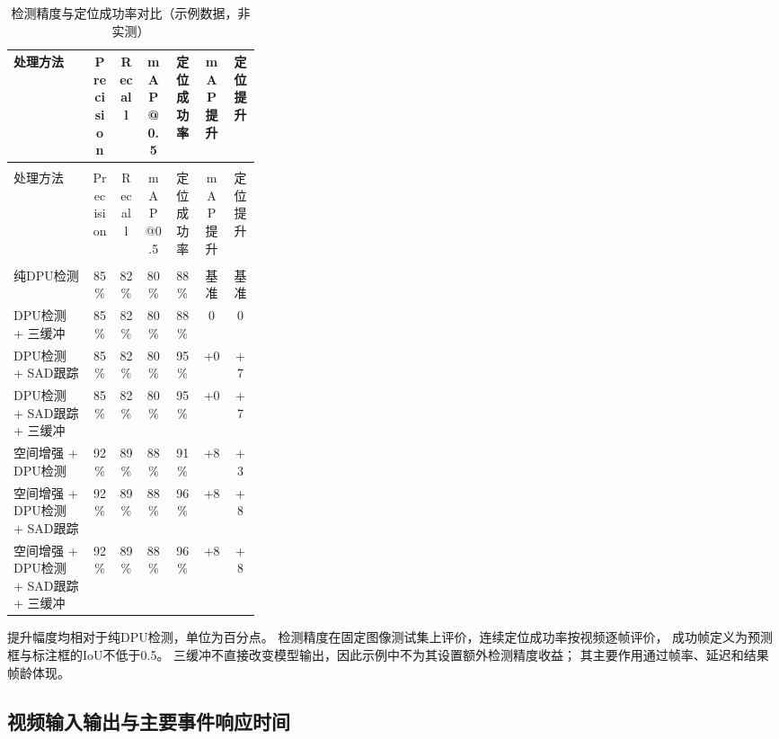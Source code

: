 \documentclass[UTF8,a4paper,12pt,fontset=windows]{ctexart}
\renewcommand{\thetable}{1-\arabic{table}}
\begin{document}
\begin{longtable}{
    >{\raggedright\arraybackslash}p{0.32\linewidth}
    cccccc
}
\caption{检测精度与定位成功率对比（示例数据，非实测）}
\label{tab:accuracy_improvement}\\

\toprule
处理方法
& Precision
& Recall
& mAP@0.5
& 定位成功率
& mAP提升
& 定位提升 \\
\midrule
\endfirsthead

\multicolumn{7}{c}{\small 表\thetable（续）}\\[4pt]
\toprule
处理方法
& Precision
& Recall
& mAP@0.5
& 定位成功率
& mAP提升
& 定位提升 \\
\midrule
\endhead

\midrule
\multicolumn{7}{r}{\footnotesize 接下页}\\
\endfoot

\bottomrule
\endlastfoot

纯DPU检测
& 85\% & 82\% & 80\% & 88\% & 基准 & 基准 \\

DPU检测 + 三缓冲
& 85\% & 82\% & 80\% & 88\% & 0 & 0 \\

DPU检测 + SAD跟踪
& 85\% & 82\% & 80\% & 95\% & +0 & +7 \\

DPU检测 + SAD跟踪 + 三缓冲
& 85\% & 82\% & 80\% & 95\% & +0 & +7 \\

空间增强 + DPU检测
& 92\% & 89\% & 88\% & 91\% & +8 & +3 \\

空间增强 + DPU检测 + SAD跟踪
& 92\% & 89\% & 88\% & 96\% & +8 & +8 \\

空间增强 + DPU检测 + SAD跟踪 + 三缓冲
& 92\% & 89\% & 88\% & 96\% & +8 & +8 \\

\end{longtable}
\endgroup

\noindent
提升幅度均相对于纯DPU检测，单位为百分点。
检测精度在固定图像测试集上评价，连续定位成功率按视频逐帧评价，
成功帧定义为预测框与标注框的IoU不低于0.5。
三缓冲不直接改变模型输出，因此示例中不为其设置额外检测精度收益；
其主要作用通过帧率、延迟和结果帧龄体现。


\subsection*{视频输入输出与主要事件响应时间}
\end{document}
